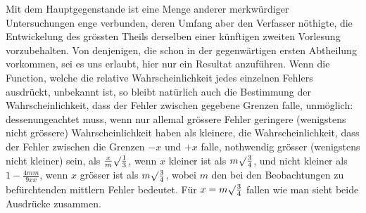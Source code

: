 Mit dem Hauptgegenstande ist eine Menge anderer merkwürdiger Unter\-suchungen enge verbunden, deren Umfang aber den Verfasser nöthigte, die Entwickelung des grössten Theils derselben einer künftigen zweiten Vorlesung vorzubehalten. Von denjenigen, die schon in der gegenwärtigen ersten Abtheilung vorkommen, sei es uns erlaubt, hier nur ein Resultat anzuführen. Wenn die Function, welche die relative Wahrscheinlichkeit jedes einzelnen Fehlers ausdrückt, unbekannt ist, so bleibt natürlich auch die Bestimmung der Wahrscheinlichkeit, dass der Fehler zwischen gegebene Grenzen falle, unmöglich: dessenungeachtet muss, wenn nur allemal grössere Fehler geringere (wenigstens nicht grössere) Wahrscheinlichkeit haben als kleinere, die Wahrscheinlichkeit, dass der Fehler zwischen die Grenzen \(-x\) und \(+x\) falle, nothwendig grösser (wenigstens nicht kleiner) sein, als \(\frac{x}{m}\surd\frac13\), wenn \(x\) kleiner ist als \(m\surd\frac34\), und nicht kleiner als \(1-\frac{4mm}{9xx}\), wenn \(x\) grösser ist als \(m\surd\frac34\), wobei \(m\) den bei den Beobachtungen zu befürchtenden mittlern Fehler bedeutet. Für \(x=m\surd\frac34\) fallen wie man sieht beide Ausdrücke zusammen.

